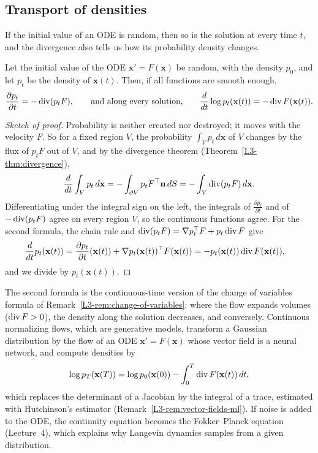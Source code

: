 \subsection{Transport of densities}

If the initial value of an ODE is random, then so is the solution at every time $t$, and the divergence also tells us how its probability density changes.

\begin{proposition}\label{L3-prop:continuity}
    Let the initial value of the ODE $\mathbf{x}' = F(\mathbf{x})$ be random, with the density $p_0$, and let $p_t$ be the density of $\mathbf{x}(t)$. Then, if all functions are smooth enough,
    \[\frac{\partial p_t}{\partial t} = -\operatorname{div}(p_tF), \qquad \text{and along every solution,} \qquad \frac{d}{dt}\log p_t(\mathbf{x}(t)) = -\operatorname{div} F(\mathbf{x}(t)).\]
\end{proposition}

\begin{proof}[Sketch of proof]
    Probability is neither created nor destroyed; it moves with the velocity $F$. So for a fixed region $V$, the probability $\int_V p_t\, d\mathbf{x}$ of $V$ changes by the flux of $p_tF$ out of $V$, and by the divergence theorem (Theorem~\ref{L3-thm:divergence}),
    \[\frac{d}{dt}\int_V p_t\, d\mathbf{x} = -\int_{\partial V} p_tF^\top\mathbf{n}\, dS = -\int_V \operatorname{div}(p_tF)\, d\mathbf{x}.\]
    Differentiating under the integral sign on the left, the integrals of $\frac{\partial p_t}{\partial t}$ and of $-\operatorname{div}(p_tF)$ agree on every region $V$, so the continuous functions agree. For the second formula, the chain rule and $\operatorname{div}(p_tF) = \nabla p_t^\top F + p_t\operatorname{div} F$ give
    \begin{align*}
        \frac{d}{dt}p_t(\mathbf{x}(t)) &= \frac{\partial p_t}{\partial t}(\mathbf{x}(t)) + \nabla p_t(\mathbf{x}(t))^\top F(\mathbf{x}(t)) = -p_t(\mathbf{x}(t))\operatorname{div} F(\mathbf{x}(t)),
    \end{align*}
    and we divide by $p_t(\mathbf{x}(t))$.
\end{proof}

The second formula is the continuous-time version of the change of variables formula of Remark~\ref{L3-rem:change-of-variables}: where the flow expands volumes ($\operatorname{div} F > 0$), the density along the solution decreases, and conversely. Continuous normalizing flows, which are generative models, transform a Gaussian distribution by the flow of an ODE $\mathbf{x}' = F(\mathbf{x})$ whose vector field is a neural network, and compute densities by
\[\log p_T(\mathbf{x}(T)) = \log p_0(\mathbf{x}(0)) - \int_0^T \operatorname{div} F(\mathbf{x}(t))\, dt,\]
which replaces the determinant of a Jacobian by the integral of a trace, estimated with Hutchinson's estimator (Remark~\ref{L3-rem:vector-fields-ml}). If noise is added to the ODE, the continuity equation becomes the Fokker--Planck equation (Lecture~4), which explains why Langevin dynamics samples from a given distribution.

